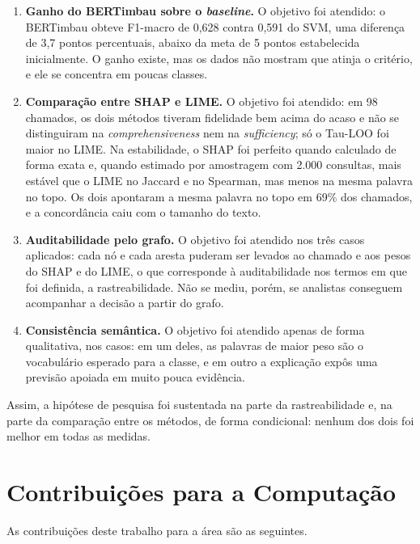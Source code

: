 \documentclass[
    12pt,                %
    openright,           %
    oneside,             %
    a4paper,             %
    english,             %
    brazil               %
]{abntex2}
\begin{document}
\begin{enumerate}
    \item \textbf{Ganho do BERTimbau sobre o \textit{baseline}.} O objetivo foi atendido: o BERTimbau obteve F1-macro de 0,628 contra 0,591 do SVM, uma diferença de 3,7 pontos percentuais, abaixo da meta de 5 pontos estabelecida inicialmente. O ganho existe, mas os dados não mostram que atinja o critério, e ele se concentra em poucas classes.

    \item \textbf{Comparação entre SHAP e LIME.} O objetivo foi atendido: em 98 chamados, os dois métodos tiveram fidelidade bem acima do acaso e não se distinguiram na \textit{comprehensiveness} nem na \textit{sufficiency}; só o Tau-LOO foi maior no LIME. Na estabilidade, o SHAP foi perfeito quando calculado de forma exata e, quando estimado por amostragem com 2.000 consultas, mais estável que o LIME no Jaccard e no Spearman, mas menos na mesma palavra no topo. Os dois apontaram a mesma palavra no topo em 69\% dos chamados, e a concordância caiu com o tamanho do texto.

    \item \textbf{Auditabilidade pelo grafo.} O objetivo foi atendido nos três casos aplicados: cada nó e cada aresta puderam ser levados ao chamado e aos pesos do SHAP e do LIME, o que corresponde à auditabilidade nos termos em que foi definida, a rastreabilidade. Não se mediu, porém, se analistas conseguem acompanhar a decisão a partir do grafo.

    \item \textbf{Consistência semântica.} O objetivo foi atendido apenas de forma qualitativa, nos casos: em um deles, as palavras de maior peso são o vocabulário esperado para a classe, e em outro a explicação expôs uma previsão apoiada em muito pouca evidência.
\end{enumerate}

Assim, a hipótese de pesquisa foi sustentada na parte da rastreabilidade e, na parte da comparação entre os métodos, de forma condicional: nenhum dos dois foi melhor em todas as medidas.

\section{Contribuições para a Computação}
As contribuições deste trabalho para a área são as seguintes.
 
\end{document}
